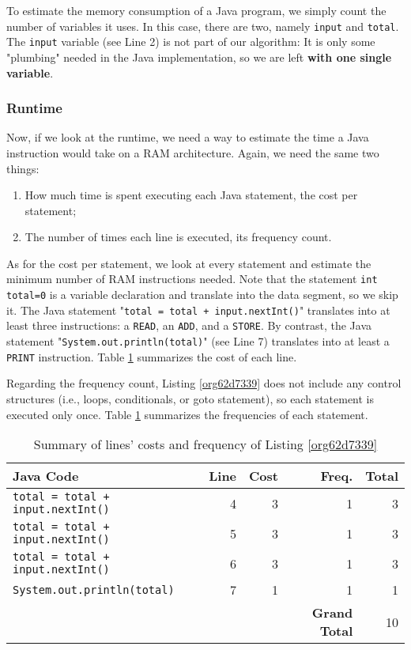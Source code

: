 \documentclass[11pt]{article}
\begin{document}
To estimate the memory consumption of a Java program, we simply count
the number of variables it uses. In this case, there are two,
namely \texttt{input} and \texttt{total}. The \texttt{input} variable (see Line 2) is
not part of our algorithm: It is only some "plumbing" needed in the
Java implementation, so we are left \textbf{with one single variable}.

\subsubsection*{Runtime}
\label{sec:org68bc6af}

Now, if we look at the runtime, we need a way to estimate the time a
Java instruction would take on a RAM architecture. Again, we need the
same two things:
\begin{enumerate}
\item How much time is spent executing each Java statement, the cost per
statement;
\item The number of times each line is executed, its frequency count.
\end{enumerate}

As for the cost per statement, we look at every statement and estimate
the minimum number of RAM instructions needed. Note that the statement
\texttt{int total=0} is a variable declaration and translate into the data
segment, so we skip it. The Java statement "\texttt{total = total +
input.nextInt()}" translates into at least three instructions: a
\texttt{READ}, an \texttt{ADD}, and a \texttt{STORE}. By contrast, the Java statement
"\texttt{System.out.println(total)}" (see Line 7) translates into at
least a \texttt{PRINT} instruction. Table \ref{tab:orga7b6e18} summarizes the
cost of each line.

Regarding the frequency count, Listing \ref{org62d7339} does not
include any control structures (i.e., loops, conditionals, or goto
statement), so each statement is executed only once. Table
\ref{tab:orga7b6e18} summarizes the frequencies of each statement.

\begin{table}[htbp]
\caption{\label{tab:orga7b6e18}Summary of lines' costs and frequency of Listing \ref{org62d7339}}
\centering
\begin{tabular}{lrrrr}
Java Code & Line & Cost &  Freq. & Total\\
\hline
\texttt{total = total + input.nextInt()} & 4 & 3 & 1 & 3\\
\texttt{total = total + input.nextInt()} & 5 & 3 & 1 & 3\\
\texttt{total = total + input.nextInt()} & 6 & 3 & 1 & 3\\
\texttt{System.out.println(total)} & 7 & 1 & 1 & 1\\
\hline
 &  &  & \textbf{Grand Total} & 10\\
\end{tabular}
\end{table}
\end{document}
